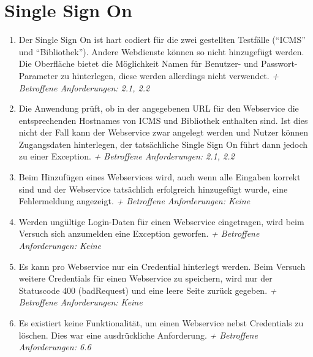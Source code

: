\documentclass[12pt,DIV14,BCOR10mm,a4paper,parskip=half-,headsepline,headinclude,english,ngerman,bibliography=totocnumbered]{scrreprt}
\begin{document}
\section{Single Sign On}
\begin{enumerate}[resume]
 \item Der Single Sign On ist hart codiert für die zwei gestellten Testfälle (\enquote{ICMS} und \enquote{Bibliothek}). Andere Webdienste können so nicht hinzugefügt werden. Die Oberfläche bietet die Möglichkeit Namen für Benutzer- und Passwort-Parameter zu hinterlegen, diese werden allerdings nicht verwendet.\newline
\textit{+ Betroffene Anforderungen: 2.1, 2.2}
  
\item Die Anwendung prüft, ob in der angegebenen URL für den Webservice die entsprechenden Hostnames von ICMS und Bibliothek enthalten sind. Ist dies nicht der Fall kann der Webservice zwar angelegt werden und Nutzer können Zugangsdaten hinterlegen, der tatsächliche Single Sign On führt dann jedoch zu einer Exception.\newline
\textit{+ Betroffene Anforderungen: 2.1, 2.2}
  
\item Beim Hinzufügen eines Webservices wird, auch wenn alle Eingaben korrekt sind und der Webservice tatsächlich erfolgreich hinzugefügt wurde, eine Fehlermeldung angezeigt.\newline
\textit{+ Betroffene Anforderungen: Keine}
  
\item Werden ungültige Login-Daten für einen Webservice eingetragen, wird beim Versuch sich anzumelden eine Exception geworfen.\newline
\textit{+ Betroffene Anforderungen: Keine} 

\item Es kann pro Webservice nur ein Credential hinterlegt werden. Beim Versuch weitere Credentials für einen Webservice zu speichern, wird nur der Statuscode 400 (badRequest) und eine leere Seite zurück gegeben.\newline
\textit{+ Betroffene Anforderungen: Keine} 

\item Es existiert keine Funktionalität, um einen Webservice nebst Credentials zu löschen. Dies war eine ausdrückliche Anforderung.\newline
\textit{+ Betroffene Anforderungen: 6.6}
 \end{enumerate}
 
\end{document}
